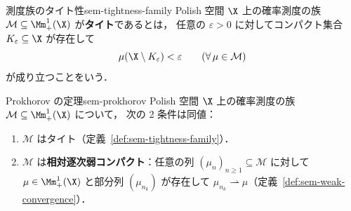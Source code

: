 \begin{definition}{測度族のタイト性}{sem-tightness-family}
  Polish 空間 $\X$ 上の確率測度の族
  $\mathcal{M} \subseteq \Mm_+^1(\X)$ が\textbf{タイト}であるとは，
  任意の $\varepsilon > 0$ に対してコンパクト集合 $K_\varepsilon \subseteq \X$ が存在して
  \[
    \mu(\X \setminus K_\varepsilon) < \varepsilon \qquad (\forall\, \mu \in \mathcal{M})
  \]
  が成り立つことをいう．
\end{definition}

\begin{proposition}{Prokhorov の定理}{sem-prokhorov}
  Polish 空間 $\X$ 上の確率測度の族 $\mathcal{M} \subseteq \Mm_+^1(\X)$ について，
  次の 2 条件は同値：
  \begin{enumerate}
    \item[(i)] $\mathcal{M}$ はタイト（定義~\ref{def:sem-tightness-family}）．
    \item[(ii)] $\mathcal{M}$ は\textbf{相対逐次弱コンパクト}：任意の列
      $(\mu_n)_{n \geq 1} \subseteq \mathcal{M}$ に対して
      $\mu \in \Mm_+^1(\X)$ と部分列 $(\mu_{n_k})$ が存在して
      $\mu_{n_k} \rightharpoonup \mu$（定義~\ref{def:sem-weak-convergence}）．
  \end{enumerate}
\end{proposition}

